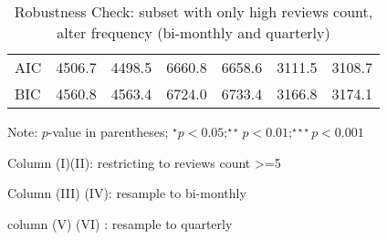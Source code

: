\begin{table}[]
\begin{threeparttable}[t]
\begin{tabular}{@{}lcccccc@{}}
AIC                          & 4506.7         & 4498.5         & 6660.8         & 6658.6         & 3111.5         & 3108.7         \\
BIC                          & 4560.8         & 4563.4         & 6724.0         & 6733.4         & 3166.8         & 3174.1         \\ \bottomrule
\end{tabular}
\begin{tablenotes}
	\item Note: $p$-value in parentheses; $^\star p<0.05;^{\star\star} p<0.01;^{\star\star\star} p<0.001 $
	\item Column (I)(II): restricting to reviews count >=5
	\item Column (III) (IV): resample to bi-monthly 
	\item column (V) (VI) : resample to quarterly  
\end{tablenotes}
\caption{Robustness Check: subset with only high reviews count, alter frequency (bi-monthly and quarterly)}
\end{threeparttable}
\label{rob_subsettingreviewsct}
\end{table} 